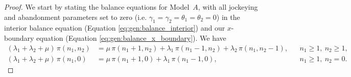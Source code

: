 \begin{proof}
    We start by stating the balance equations for Model~$A$, with all jockeying and abandonment parameters set to zero (i.e. $\gamma_1=\gamma_2=\theta_1=\theta_2=0$) in the interior balance equation (Equation \eqref{eq:gen:balance_interior}) and our $x$-boundary equation (Equation \eqref{eq:gen:balance_x_boundary}). We have
    \begin{align}
        (\lambda_1+\lambda_2+\mu)\,\pi(n_1,n_2)
            &= \mu\,\pi(n_1+1,n_2) + \lambda_1\,\pi(n_1-1,n_2) + \lambda_2\,\pi(n_1,n_2-1),
            && n_1\geq1,\ n_2\geq1, \label{eq:A:ppgf_interior}\\
        (\lambda_1+\lambda_2+\mu)\,\pi(n_1,0)
            &= \mu\,\pi(n_1+1,0) + \lambda_1\,\pi(n_1-1,0),
            && n_1\geq1,\ n_2=0. \label{eq:A:ppgf_xbound}
    \end{align}


\end{proof}
